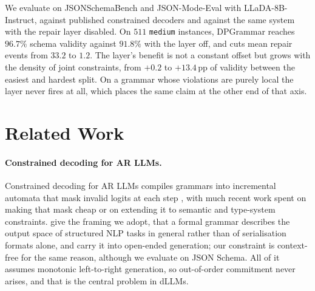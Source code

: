 \documentclass{article}
\begin{document}
We evaluate on JSONSchemaBench \citep{geng2025jsonschemabenchrigorousbenchmarkstructured}
and JSON-Mode-Eval \citep{nousresearch2024jsonmodeeval,ethsri2025jsonmodeevalextended}
with LLaDA-8B-Instruct, against published constrained decoders and against the
same system with the repair layer disabled. On $511$
\texttt{medium} instances, DPGrammar reaches $96.7\%$ schema validity against
$91.8\%$ with the layer off, and cuts mean repair events from $33.2$ to $1.2$.
The layer's benefit is not a constant offset but grows with the density of joint
constraints, from $+0.2$ to $+13.4$\,pp of validity between the easiest and
hardest split. On a grammar whose violations
are purely local the layer never fires at all, which places the same claim at
the other end of that axis.

\section{Related Work}

\paragraph{Constrained decoding for AR LLMs.}
Constrained decoding for AR LLMs compiles grammars into incremental automata that mask invalid logits at each step \citep{outlines, dong2024xgrammar, microsoft2025llguidance}, with much recent work spent on making that mask cheap \citep{ugare2025syncode,park2025flexible} or on extending it to semantic \citep{poesia2022synchromesh} and type-system \citep{muendler2025typeconstrained} constraints. \citet{geng2023grammar} give the framing we adopt, that a formal grammar describes the output space of structured NLP tasks in general rather than of serialisation formats alone, and \citet{tuccio2025grammarllm} carry it into open-ended generation; our constraint is context-free for the same reason, although we evaluate on JSON Schema. All of it assumes monotonic left-to-right generation, so out-of-order commitment never arises, and that is the central problem in dLLMs.
\end{document}
